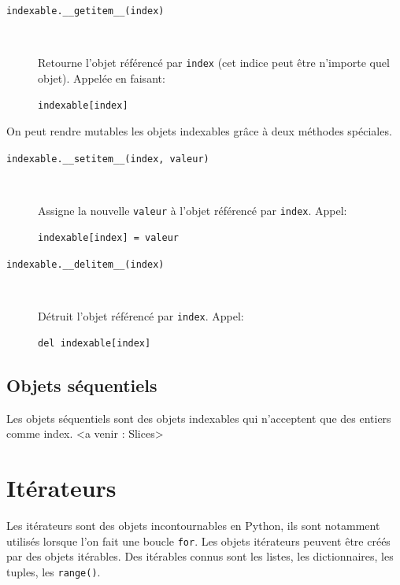 \documentclass[a4paper, 10pt]{article}
\begin{document}
\begin{description}
    \item[\texttt{indexable.__getitem__(index)}]~

    Retourne l'objet référencé par \texttt{index} (cet indice peut être n'importe quel objet). Appelée en faisant:
    \begin{verbatim}
indexable[index]
    \end{verbatim}
\end{description}

On peut rendre mutables les objets indexables grâce à deux méthodes spéciales.

\begin{description}
    \item[\texttt{indexable.__setitem__(index, valeur)}]~

    Assigne la nouvelle \texttt{valeur} à l'objet référencé par \texttt{index}. Appel:
    \begin{verbatim}
indexable[index] = valeur
    \end{verbatim}

    \item[\texttt{indexable.__delitem__(index)}]~

    Détruit l'objet référencé par \texttt{index}. Appel:
    \begin{verbatim}
del indexable[index]
    \end{verbatim}
\end{description}

\subsection{Objets séquentiels}

Les objets séquentiels sont des objets indexables qui n'acceptent que des entiers comme index. <a venir : Slices>


\section{Itérateurs}\label{iterateur}

Les itérateurs sont des objets incontournables en Python, ils sont notamment utilisés lorsque l'on fait une boucle \texttt{for}. Les objets itérateurs peuvent être créés par des objets itérables. Des itérables connus sont les listes, les dictionnaires, les tuples, les \texttt{range()}.\bigskip
\end{document}
